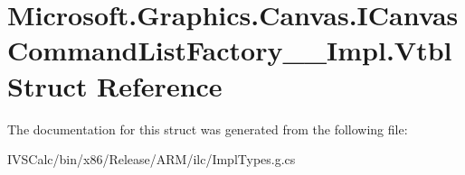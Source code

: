 \hypertarget{struct_microsoft_1_1_graphics_1_1_canvas_1_1_i_canvas_command_list_factory_____impl_1_1_vtbl}{}\section{Microsoft.\+Graphics.\+Canvas.\+I\+Canvas\+Command\+List\+Factory\+\_\+\+\_\+\+Impl.\+Vtbl Struct Reference}
\label{struct_microsoft_1_1_graphics_1_1_canvas_1_1_i_canvas_command_list_factory_____impl_1_1_vtbl}


The documentation for this struct was generated from the following file\+:\begin{DoxyCompactItemize}
\item 
I\+V\+S\+Calc/bin/x86/\+Release/\+A\+R\+M/ilc/Impl\+Types.\+g.\+cs\end{DoxyCompactItemize}
